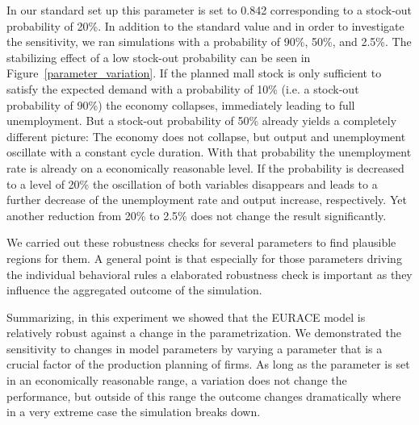 In our standard set up this parameter is set to 0.842 corresponding to a stock-out probability of 20\%. In addition to the standard value and in order to investigate the sensitivity, we ran simulations with a probability of 90\%, 50\%, and 2.5\%. The stabilizing effect of a low stock-out probability can be seen in Figure~\ref{parameter_variation}. If the planned mall stock is only sufficient to satisfy the expected demand with a probability of 10\% (i.e. a stock-out probability of 90\%) the economy collapses, immediately leading to full unemployment. But a stock-out probability of 50\% already yields a completely different picture: The economy does not collapse, but output and unemployment oscillate with a constant cycle duration. With that probability the unemployment rate is already on a economically reasonable level. If the probability is decreased to a level of 20\% the oscillation of both variables disappears and leads to a further decrease of the unemployment rate and output increase, respectively. Yet another reduction from 20\% to 2.5\% does not change the result significantly. 

We carried out these robustness checks for several parameters to find plausible regions for them. A general point is that especially for those parameters driving the individual behavioral rules a elaborated robustness check is important as they influence the aggregated outcome of the simulation.

Summarizing, in this experiment we showed that the EURACE model is relatively robust against a change in the parametrization. We demonstrated the sensitivity to changes in model parameters by varying a parameter that is a crucial factor of the production planning of firms. As long as the parameter is set in an economically reasonable range, a variation does not change the performance, but outside of this range the outcome changes dramatically where in a very extreme case the simulation breaks down. 

